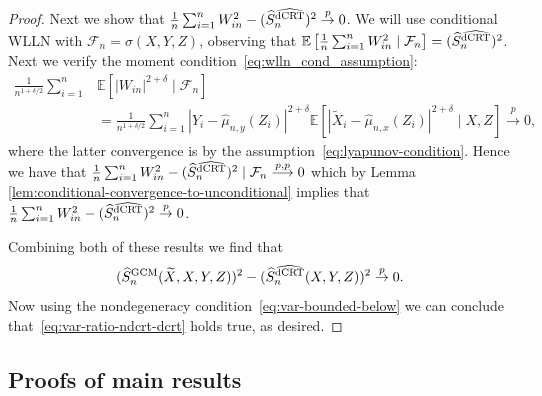 \documentclass[aos]{imsart}
\theoremstyle{definition}
\theoremstyle{remark}
\newcommand{\E}{\mathbb E}								%
\newcommand{\convp}{\overset p \rightarrow}             %
\newcommand{\srx}{X}									%
\newcommand{\srz}{Z}									%
\newcommand{\srxk}{\widetilde X}						%
\newcommand{\sry}{Y}									%
\newcommand{\GCM}{\textnormal{GCM}}						%
\newcommand{\dCRThat}{\widehat{\textnormal{dCRT}}}		%
\newcommand{\convpp}{\overset {p,p} \longrightarrow}    %
\begin{document}
\begin{proof}
	Next we show that $\frac{1}{n} \sum_{i=1}^n W^2_{in} - (\widehat S_{n}^{\dCRThat})^2 \convp 0$. We will use conditional WLLN with $\mathcal{F}_n = \sigma(\srx,\sry,\srz)$, observing that $\E\left[\frac{1}{n} \sum_{i=1}^n W^2_{in} \mid \mathcal{F}_n\right] = (\widehat S_{n}^{\dCRThat})^2 $. Next we verify the moment condition~\eqref{eq:wlln_cond_assumption}:
	\begin{align}
		\frac{1}{n^{1+\delta/2}} \sum_{i = 1}^n &\E[|W_{in}|^{2+\delta} \mid \mathcal{F}_n] \\&= \frac{1}{n^{1+\delta/2}} \sum_{i=1}^n |\sry_i-\widehat\mu_{n,y}(\srz_i)|^{2+\delta}\E\left[|\srxk_i-\widehat\mu_{n,x}(\srz_i)|^{2+\delta}\mid \srx,\srz\right] \convp 0,
	\end{align} 
	where the latter convergence is by the assumption~\eqref{eq:lyapunov-condition}.
	Hence we have that $\frac{1}{n} \sum_{i = 1}^n W^2_{in} - (\widehat S_{n}^{\dCRThat})^2  \mid \mathcal F_n \convpp 0$ which by Lemma \ref{lem:conditional-convergence-to-unconditional} implies that $\frac{1}{n} \sum_{i=1}^n W^2_{in} - (\widehat S_{n}^{\dCRThat})^2 \convp 0$.
	
	Combining both of these results we find that 
	\begin{equation*}
		(\widehat S_{n}^{\GCM}(\srxk, \srx, \sry, \srz))^2 - (\widehat S_{n}^{\dCRThat}(\srx, \sry, \srz))^2 \convp 0. 
	\end{equation*}
	Now using the nondegeneracy condition~\eqref{eq:var-bounded-below} we can conclude that~\eqref{eq:var-ratio-ndcrt-dcrt} holds true, as desired.
\end{proof}


\subsection{Proofs of main results}
\end{document}
